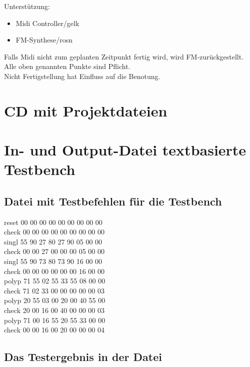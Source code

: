 Unterstützung:

\begin{itemize}
\item Midi Controller/gelk
\item FM-Synthese/rosn
\end{itemize} 

Falls Midi nicht zum geplanten Zeitpunkt fertig wird, wird FM-zurückgestellt. Alle oben genannten Punkte sind Pflicht.\\
Nicht Fertigstellung hat Einfluss auf die Benotung.



\chapter{CD mit Projektdateien}\label{sect.anhang_cd}

\chapter{In- und Output-Datei textbasierte Testbench}\label{chap.anhang_midi_input}

\section*{Datei mit Testbefehlen für die Testbench}

reset 00 00 00 00 00 00 00 00 00\\
check 00 00 00 00 00 00 00 00 00\\
singl 55 90 27 80 27 90 05 00 00\\
check 00 00 27 00 00 00 05 00 00\\
singl 55 90 73 80 73 90 16 00 00\\
check 00 00 00 00 00 00 16 00 00\\
polyp 71 55 02 55 33 55 08 00 00\\
check 71 02 33 00 00 00 00 00 03\\
polyp 20 55 03 00 20 00 40 55 00\\
check 20 00 16 00 40 00 00 00 03\\
polyp 71 00 16 55 20 55 33 00 00\\
check 00 00 16 00 20 00 00 00 04\\

\section*{Das Testergebnis in der Datei}

